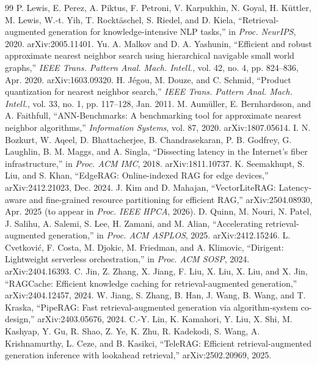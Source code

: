 \documentclass[conference]{IEEEtran}
\begin{document}
\begin{thebibliography}{99}
 P. Lewis, E. Perez, A. Piktus, F. Petroni, V. Karpukhin, N. Goyal,
H. K\"uttler, M. Lewis, W.-t. Yih, T. Rockt\"aschel, S. Riedel, and D. Kiela, ``Retrieval-augmented
generation for knowledge-intensive NLP tasks,'' in \emph{Proc. NeurIPS}, 2020. arXiv:2005.11401.
 Yu. A. Malkov and D. A. Yashunin, ``Efficient and robust approximate nearest
neighbor search using hierarchical navigable small world graphs,'' \emph{IEEE Trans. Pattern Anal.
Mach. Intell.}, vol. 42, no. 4, pp. 824--836, Apr. 2020. arXiv:1603.09320.
 H. J\'egou, M. Douze, and C. Schmid, ``Product quantization for nearest
neighbor search,'' \emph{IEEE Trans. Pattern Anal. Mach. Intell.}, vol. 33, no. 1, pp. 117--128,
Jan. 2011.
 M. Aum\"uller, E. Bernhardsson, and A. Faithfull, ``ANN-Benchmarks: A
benchmarking tool for approximate nearest neighbor algorithms,'' \emph{Information Systems},
vol. 87, 2020. arXiv:1807.05614.
 I. N. Bozkurt, W. Aqeel, D. Bhattacherjee, B. Chandrasekaran,
P. B. Godfrey, G. Laughlin, B. M. Maggs, and A. Singla, ``Dissecting latency in the Internet's
fiber infrastructure,'' in \emph{Proc. ACM IMC}, 2018. arXiv:1811.10737.
 K. Seemakhupt, S. Liu, and S. Khan, ``EdgeRAG: Online-indexed RAG for edge
devices,'' arXiv:2412.21023, Dec. 2024.
 J. Kim and D. Mahajan, ``VectorLiteRAG: Latency-aware and fine-grained
resource partitioning for efficient RAG,'' arXiv:2504.08930, Apr. 2025 (to appear in \emph{Proc.
IEEE HPCA}, 2026).
 D. Quinn, M. Nouri, N. Patel, J. Salihu, A. Salemi, S. Lee, H. Zamani, and
M. Alian, ``Accelerating retrieval-augmented generation,'' in \emph{Proc. ACM ASPLOS}, 2025.
arXiv:2412.15246.
 L. Cvetkovi\'c, F. Costa, M. Djokic, M. Friedman, and A. Klimovic, ``Dirigent:
Lightweight serverless orchestration,'' in \emph{Proc. ACM SOSP}, 2024. arXiv:2404.16393.
 C. Jin, Z. Zhang, X. Jiang, F. Liu, X. Liu, X. Liu, and X. Jin, ``RAGCache:
Efficient knowledge caching for retrieval-augmented generation,'' arXiv:2404.12457, 2024.
 W. Jiang, S. Zhang, B. Han, J. Wang, B. Wang, and T. Kraska, ``PipeRAG: Fast
retrieval-augmented generation via algorithm-system co-design,'' arXiv:2403.05676, 2024.
 C.-Y. Lin, K. Kamahori, Y. Liu, X. Shi, M. Kashyap, Y. Gu, R. Shao, Z. Ye,
K. Zhu, R. Kadekodi, S. Wang, A. Krishnamurthy, L. Ceze, and B. Kasikci, ``TeleRAG: Efficient
retrieval-augmented generation inference with lookahead retrieval,'' arXiv:2502.20969, 2025.

\end{thebibliography}
\end{document}
